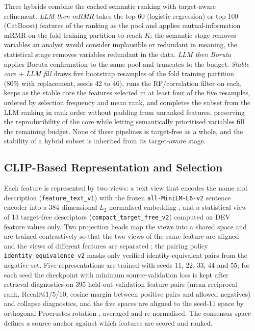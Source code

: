 \documentclass[final,5p,twocolumn]{elsarticle}
\newcommand{\Kfeat}{K}
\begin{document}
Three hybrids combine the cached semantic ranking with target-aware refinement. \emph{LLM then mRMR} takes the top 60 (logistic regression) or top 100 (CatBoost) features of the ranking as the pool and applies mutual-information mRMR on the fold training partition to reach $\Kfeat$: the semantic stage removes variables an analyst would consider implausible or redundant in meaning, the statistical stage removes variables redundant in the data. \emph{LLM then Boruta} applies Boruta confirmation to the same pool and truncates to the budget. \emph{Stable core + LLM fill} draws five bootstrap resamples of the fold training partition (80\% with replacement, seeds 42 to 46), runs the RF/correlation filter on each, keeps as the stable core the features selected in at least four of the five resamples, ordered by selection frequency and mean rank, and completes the subset from the LLM ranking in rank order without padding from unranked features, preserving the reproducibility of the core while letting semantically prioritised variables fill the remaining budget. None of these pipelines is target-free as a whole, and the stability of a hybrid subset is inherited from its target-aware stage.

\subsection{CLIP-Based Representation and Selection}
\label{subsec:clip_fs}

\begin{sloppypar}
Each feature is represented by two views: a text view that encodes the name and description (\texttt{feature\_text\_v1}) with the frozen \texttt{all-MiniLM-L6-v2} sentence encoder into a 384-dimensional $L_2$-normalised embedding \cite{wang2020minilm,reimers2019}, and a statistical view of 13 target-free descriptors (\texttt{compact\_target\_free\_v2}) computed on DEV feature values only. Two projection heads map the views into a shared space and are trained contrastively so that the two views of the same feature are aligned and the views of different features are separated \cite{radford2021,oord2018}; the pairing policy \texttt{identity\_equivalence\_v2} masks only verified identity-equivalent pairs from the negative set. Five representations are trained with seeds 11, 22, 33, 44 and 55; for each seed the checkpoint with minimum source-validation loss is kept after retrieval diagnostics on 395 held-out validation feature pairs (mean reciprocal rank, Recall@1/5/10, cosine margin between positive pairs and allowed negatives) and collapse diagnostics, and the five spaces are aligned to the seed-11 space by orthogonal Procrustes rotation \cite{schonemann1966}, averaged and re-normalised. The consensus space defines a source anchor against which features are scored and ranked.
\end{sloppypar}
\end{document}
